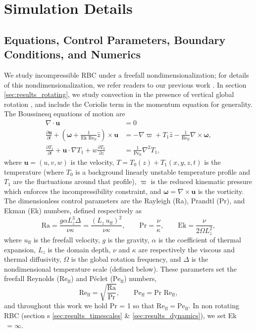 \documentclass[aps, pre, onecolumn, nofootinbib, notitlepage, groupedaddress, amsfonts, amssymb, amsmath, longbibliography, superscriptaddress]{revtex4-1}
\newcommand{\DivU}{\ensuremath{\nabla\cdot\bm{u}}}
\newcommand{\grad}{\ensuremath{\nabla}}
\newcommand{\Reff}{\ensuremath{\text{Re}_{\text{ff}}}}
\newcommand{\Peff}{\ensuremath{\text{Pe}_{\text{ff}}}}
\newcommand{\ea}[1]{{\color{red} #1}}
\begin{document}
\section{Simulation Details}
\label{sec:simulations}
\ea{
\subsection{Equations, Control Parameters, Boundary Conditions, and Numerics}
}
We study incompressible RBC under a freefall nondimensionalization; for details of this nondimensionalization, we refer readers to our previous work \cite{anders&all2018}.
In section \ref{sec:results_rotating}, we study convection in the presence of vertical global rotation \cite{julien&all1996}, and include the Coriolis term in the momentum equation for generality.
The Boussinesq equations of motion are
\begin{align}
\DivU &= 0
	\label{eqn:incompressible}
\\
\frac{\partial \bm{u}}{\partial t} + \left(\bm{\omega} + \frac{1}{\text{Ek }\Reff}\hat{z}\right)\times\bm{u} 
&= - \grad \varpi + T_1\hat{z} - \frac{1}{\Reff}\grad\times\bm{\omega},
	\label{eqn:bouss_momentum}
\\
\frac{\partial T_1}{\partial t}  + \bm{u}\cdot\grad T_1 + w \frac{\partial T_0}{\partial z} 
&= \frac{1}{\Peff}\grad^2 T_1,
	\label{eqn:bouss_energy}
\end{align}
where $\bm{u} = (u, v, w)$ is the velocity, $T = T_0(z) + T_1(x, y, z, t)$ is the temperature (where $T_0$ is \ea{a background linearly unstable temperature profile} and $T_1$ are the fluctuations around that profile), $\varpi$ is the reduced kinematic pressure \cite{anders&all2018} which enforces the incompressibility constraint, and $\bm{\omega} = \grad \times \bm{u}$ is the vorticity.
The dimensionless control parameters are the Rayleigh (Ra), Prandtl (Pr), and Ekman (Ek) numbers, defined respectively as
\begin{equation}
\text{Ra} = \frac{g \alpha L_z^3 \Delta}{\nu\kappa} = \frac{(L_z\,u_{\text{ff}})^2}{\nu\kappa}, \qquad \text{Pr} = \frac{\nu}{\kappa}, \qquad \text{Ek} = \frac{\nu}{2\Omega L_z^2},
\end{equation}
where $u_{\text{ff}}$ is the freefall velocity, $g$ is the gravity, $\alpha$ is the coefficient of thermal expansion, $L_z$ is the domain depth, $\nu$ and $\kappa$ are respectively the viscous and thermal diffusivity, $\Omega$ is the global rotation frequency, and $\Delta$ is the nondimensional temperature scale (defined below).
These parameters set the freefall Reynolds (\Reff) and P\'{e}clet (\Peff) numbers, 
\begin{equation}
\Reff = \sqrt{\frac{\text{Ra}}{\text{Pr}}},\qquad
\Peff = \text{Pr }\Reff,
\end{equation}
and throughout this work we hold Pr = 1 so that $\Reff = \Peff$.
In non rotating RBC (section\ea{s} \ref{sec:results_timescales}\ea{\& \ref{sec:results_dynamics}}), we set Ek$\,= \infty$.
\end{document}
